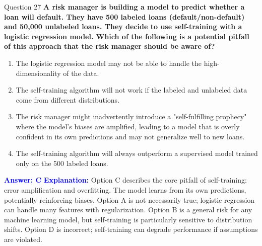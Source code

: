 \documentclass[8pt]{beamer}  %
\begin{document}
	\begin{frame}{Question 27}
		\textbf{A risk manager is building a model to predict whether a loan will default. They have 500 labeled loans (default/non-default) and 50,000 unlabeled loans. They decide to use self-training with a logistic regression model. Which of the following is a potential pitfall of this approach that the risk manager should be aware of?}
		\begin{enumerate}
			\item The logistic regression model may not be able to handle the high-dimensionality of the data.
			\item The self-training algorithm will not work if the labeled and unlabeled data come from different distributions.
			\item The risk manager might inadvertently introduce a "self-fulfilling prophecy" where the model's biases are amplified, leading to a model that is overly confident in its own predictions and may not generalize well to new loans.
			\item The self-training algorithm will always outperform a supervised model trained only on the 500 labeled loans.
		\end{enumerate}
		\vspace{0.2cm}
		\textcolor{blue}{\textbf{Answer: C}}
		\vspace{0.2cm}
		\textcolor{blue}{\textbf{Explanation:}} Option C describes the core pitfall of self-training: error amplification and overfitting. The model learns from its own predictions, potentially reinforcing biases. Option A is not necessarily true; logistic regression can handle many features with regularization. Option B is a general risk for any machine learning model, but self-training is particularly sensitive to distribution shifts. Option D is incorrect; self-training can degrade performance if assumptions are violated.
	\end{frame}
	
\end{document}
